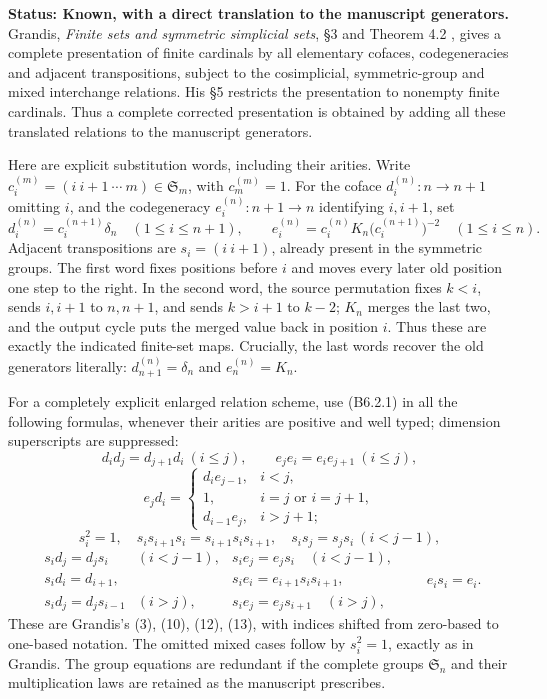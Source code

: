 \textbf{Status: Known, with a direct translation to the manuscript
generators.} Grandis, \emph{Finite sets and symmetric simplicial sets},
§3 and Theorem 4.2 \cite{B56Grandis2001}, gives a complete presentation
of finite cardinals by all elementary cofaces, codegeneracies and
adjacent transpositions, subject to the cosimplicial, symmetric-group
and mixed interchange relations. His §5 restricts the presentation to
nonempty finite cardinals. Thus a complete corrected presentation is
obtained by adding all these translated relations to the manuscript
generators.

Here are explicit substitution words, including their arities.  Write
\(c_i^{(m)}=(i\ i+1\ \cdots\ m)\in\mathfrak S_m\), with
\(c_m^{(m)}=1\).  For the coface \(d_i^{(n)}:n\to n+1\) omitting
\(i\), and the codegeneracy \(e_i^{(n)}:n+1\to n\) identifying
\(i,i+1\), set
\[
 d_i^{(n)}=c_i^{(n+1)}\delta_n\quad(1\le i\le n+1),\qquad
 e_i^{(n)}=c_i^{(n)}K_n\bigl(c_i^{(n+1)}\bigr)^{-2}
       \quad(1\le i\le n).
 \tag{B6.2.1}
\]
Adjacent transpositions are \(s_i=(i\ i+1)\), already present in the
symmetric groups.  The first word fixes positions before \(i\) and
moves every later old position one step to the right.  In the second
word, the source permutation fixes \(k<i\), sends \(i,i+1\) to
\(n,n+1\), and sends \(k>i+1\) to \(k-2\); \(K_n\) merges the last
two, and the output cycle puts the merged value back in position
\(i\).  Thus these are exactly the indicated finite-set maps.
Crucially, the last words recover the old generators literally:
\(d_{n+1}^{(n)}=\delta_n\) and \(e_n^{(n)}=K_n\).

For a completely explicit enlarged relation scheme, use (B6.2.1) in
all the following formulas, whenever their arities are positive and
well typed; dimension superscripts are suppressed:
\[
 d_i d_j=d_{j+1}d_i\ (i\le j),\qquad
 e_j e_i=e_i e_{j+1}\ (i\le j),
\]
\[
 e_jd_i=
 \begin{cases}
 d_i e_{j-1},&i<j,\\
 1,&i=j\text{ or }i=j+1,\\
 d_{i-1}e_j,&i>j+1;
 \end{cases}
\]
\[
 s_i^2=1,\quad s_i s_{i+1}s_i=s_{i+1}s_i s_{i+1},\quad
 s_i s_j=s_j s_i\ (i<j-1),
\]
\[
 \begin{array}{lll}
 s_i d_j=d_j s_i &(i<j-1),&s_i e_j=e_j s_i\quad(i<j-1),\\
 s_i d_i=d_{i+1},&&s_i e_i=e_{i+1}s_i s_{i+1},\\
 s_i d_j=d_j s_{i-1}&(i>j),&s_i e_j=e_j s_{i+1}\quad(i>j),
 \end{array}
 \qquad e_i s_i=e_i.
 \tag{B6.2.2}
\]
These are Grandis's (3), (10), (12), (13), with indices shifted from
zero-based to one-based notation.  The omitted mixed cases follow by
\(s_i^2=1\), exactly as in Grandis.  The group equations are redundant
if the complete groups \(\mathfrak S_n\) and their multiplication laws
are retained as the manuscript prescribes.

